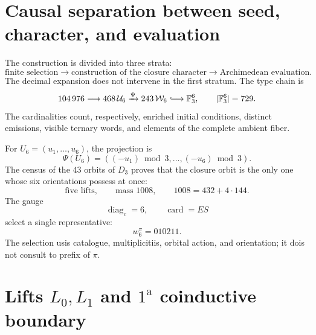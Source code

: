 
\label{gfp:b:chap:biografia-pi-autonoma}

\section{Causal separation between seed, character, and evaluation}

The construction is divided into three strata:
\[
 \text{finite selection}
 \longrightarrow
 \text{construction of the closure character}
 \longrightarrow
 \text{Archimedean evaluation}.
\]
The decimal expansion does not intervene in the first stratum. The type chain
is
\begin{equation}
 104\,976
 \longrightarrow468\,\mathcal U_6
 \xrightarrow{\Psi}243\,\mathcal W_6
 \lhook\joinrel\longrightarrow\mathbb F_3^6,
 \qquad|\mathbb F_3^6|=729.
 \label{gfp:b:eq:cadena-tipica-pi-autonoma}
\end{equation}
The cardinalities count, respectively, enriched initial conditions,
distinct emissions, visible ternary words, and elements
of the complete ambient fiber.

For \(U_6=(u_1,\ldots,u_6)\), the projection is
\[
 \Psi(U_6)=((-u_1)\bmod3,\ldots,(-u_6)\bmod3).
\]
The census of the \(43\) orbits of \(D_3\) proves that the closure
orbit is the only one whose six orientations possess at once:
\[
 \text{five lifts},\qquad
 \text{mass }1008,\qquad
 1008=432+4\cdot144.
\]
The gauge
\[
 \operatorname{diag}_c=6,
 \qquad
 \operatorname{card}=ES
\]
select a single representative:
\begin{equation}
 \boxed{w_6^\pi=010211.}
 \label{gfp:b:eq:semilla-pi-autonoma}
\end{equation}
The selection usis catalogue, multiplicitiis, orbital action, and orientation;
it dois not consult to prefix of \(\pi\).

\section{Lifts \texorpdfstring{\(L_0,L_1\)}{L0, L1} and \(1^{\mathrm a}\) coinductive boundary}

